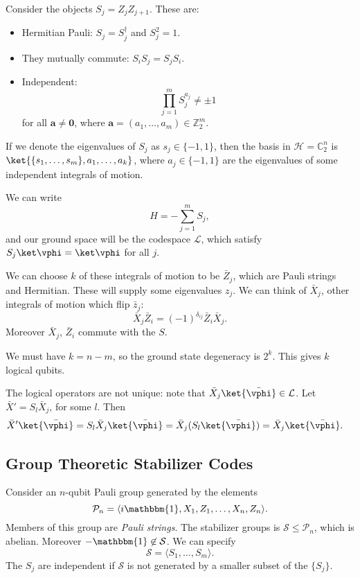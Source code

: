 \documentclass[12pt]{article}
\begin{document}
Consider the objects $S_j = Z_j Z_{j+1}$. These are:
\begin{itemize}
	\item Hermitian Pauli: $S_j = S_j^{\dagger}$ and $S_j^2 = 1$.
	\item They mutually commute: $S_i S_j = S_j S_i$.
	\item Independent:
		\[
		\prod_{j = 1}^{m} S_j^{a_j} \neq \pm 1
		\]
		for all $\mathbf{a} \neq \mathbf{0}$, where $\mathbf{a} = (a_1, \ldots, a_m) \in \mathbb{Z}_2^{m}$.
\end{itemize}

If we denote the eigenvalues of $S_j$ as $s_j \in \{-1, 1\}$, then the basis in $\mathcal{H} = \mathbb{C}_2^{n}$ is $\ket{\{s_1, \ldots, s_m\}, a_1, \ldots, a_k }$, where $a_j \in \{-1, 1\}$ are the eigenvalues of some independent integrals of motion.

We can write
\[
H = - \sum_{j = 1}^{m} S_j,
\]
and our ground space will be the codespace $\mathcal{L}$, which satisfy $S_j \ket \vphi = \ket \vphi$ for all $j$.

We can choose $k$ of these integrals of motion to be $\bar Z_j$, which are Pauli strings and Hermitian. These will supply some eigenvalues $z_j$. We can think of $\bar X_j$, other integrals of motion which flip $\bar z_j$:
\[
\bar X_j \bar Z_i = (-1)^{\delta_{ij}} \bar Z_i \bar X_j.
\]
Moreover $\bar X_j$, $\bar Z_i$ commute with the $S$.

We must have $k = n - m$, so the ground state degeneracy is $2^{k}$. This gives $k$ logical qubits.

The logical operators are not unique: note that $\bar X_j \ket{\bar \vphi} \in \mathcal{L}$. Let $\bar X' = S_l \bar X_j$, for some $l$. Then
\begin{align*}
	\bar X' \ket {\bar \vphi} &= S_l \bar X_j \ket{\bar \vphi} = \bar X_j (S_l \ket{\bar \vphi}) = \bar X_j \ket{\bar \vphi}.
\end{align*}


\subsection{Group Theoretic Stabilizer Codes}%
\label{sub:gtsc}

Consider an $n$-qubit Pauli group generated by the elements
\[
\mathcal{P}_n = \langle i \mathbbm{1}, X_1, Z_1, \ldots, X_n, Z_n \rangle.
\]
Members of this group are \emph{Pauli strings}. The stabilizer groups is $\mathcal{S} \leq \mathcal{P}_n$, which is abelian. Moreover $- \mathbbm{1} \not \in \mathcal{S}$. We can specify
\[
\mathcal{S} = \langle S_1, \ldots, S_m \rangle.
\]
The $S_j$ are independent if $\mathcal{S}$ is not generated by a smaller subset of the $\{S_j\}$.
\end{document}
